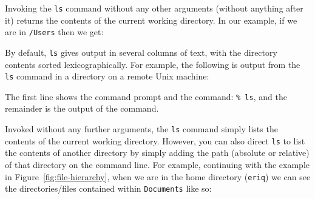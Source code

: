\documentclass[]{krantz}
\makeatletter
\newenvironment{Shaded}{\begin{snugshade}}{\end{snugshade}}
\newcommand{\ExtensionTok}[1]{#1}
\newcommand{\NormalTok}[1]{#1}
\newenvironment{kframe}{%
\medskip{}
\setlength{\fboxsep}{.8em}
 \def\at@end@of@kframe{}%
 \ifinner\ifhmode%
  \def\at@end@of@kframe{\end{minipage}}%
  \begin{minipage}{\columnwidth}%
 \fi\fi%
 \def\FrameCommand##1{\hskip\@totalleftmargin \hskip-\fboxsep
 \colorbox{shadecolor}{##1}\hskip-\fboxsep
     \hskip-\linewidth \hskip-\@totalleftmargin \hskip\columnwidth}%
 \MakeFramed {\advance\hsize-\width
   \@totalleftmargin\z@ \linewidth\hsize
   \@setminipage}}%
 {\par\unskip\endMakeFramed%
 \at@end@of@kframe}
\renewenvironment{Shaded}{\begin{kframe}}{\end{kframe}}
\makeatother
\begin{document}
Invoking the \texttt{ls} command without any other arguments (without anything after it)
returns the contents of the current working directory. In our example,
if we are in \texttt{/Users} then we get:

\begin{Shaded}
\end{Shaded}

By default, \texttt{ls} gives output in several columns of text, with the directory contents
sorted lexicographically. For example, the following is output from the \texttt{ls} command
in a directory on a remote Unix machine:

\begin{Shaded}
\end{Shaded}

The first line shows the command prompt and the command: \texttt{\%\ ls}, and the remainder is
the output of the command.

Invoked without any further arguments, the \texttt{ls}
command simply lists the contents of the current working directory. However,
you can also direct \texttt{ls} to list the contents of another directory by simply
adding the path (absolute or relative) of that directory on the command line. For example, continuing with
the example in Figure~\ref{fig:file-hierarchy}, when we are in the home directory (\texttt{eriq})
we can see the directories/files
contained within \texttt{Documents} like so:

\begin{Shaded}
\end{Shaded}
\end{document}
